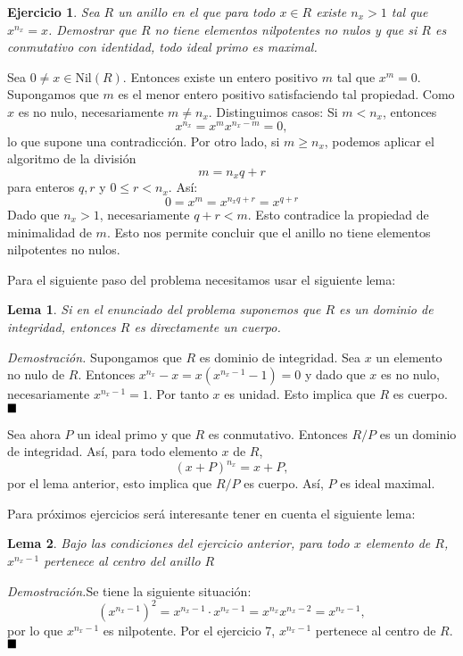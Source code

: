 \documentclass[11pt]{book}
\def\Nil{\mathrm{Nil}}
\def\qed{\hfill\blacksquare}
\newtheorem{ej}{Ejercicio}
\newtheorem{lemma}{Lema}
\theoremstyle{definition}
\begin{document}
\begin{ej}
    Sea $R$ un anillo en el que para todo $x\in R$ existe $n_x>1$ tal que $x^{n_x}=x$. Demostrar que $R$ no tiene elementos nilpotentes no nulos y que si $R$ es conmutativo con identidad, todo ideal primo es maximal.
\end{ej}
Sea $0\neq x\in \Nil(R)$. Entonces existe un entero positivo $m$ tal que $x^m=0$. Supongamos que $m$ es el menor entero positivo satisfaciendo tal propiedad. Como $x$ es no nulo, necesariamente $m\neq n_x$. Distinguimos casos: Si $m<n_x$, entonces \[
x^{n_x}=x^mx^{n_x-m}=0,
\]lo que supone una contradicción. Por otro lado, si $m\geq n_x$, podemos aplicar el algoritmo de la división\[
m=n_xq+r
\]para enteros $q,r$ y $0\leq r<n_x$. Así:\[
0=x^m=x^{n_xq+r}=x^{q+r}
\]Dado que $n_x>1$, necesariamente $q+r<m$. Esto contradice la propiedad de minimalidad de $m$. Esto nos permite concluir que el anillo no tiene elementos nilpotentes no nulos.

Para el siguiente paso del problema necesitamos usar el siguiente lema:
\begin{lemma}\label{lema-1}
    Si en el enunciado del problema suponemos que $R$ es un dominio de integridad, entonces $R$ es directamente un cuerpo.
\end{lemma}
\noindent\textit{Demostración.} Supongamos que $R$ es dominio de integridad. Sea $x$ un elemento no nulo de $R$. Entonces $x^{n_x}-x=x(x^{n_x-1}-1)=0$ y dado que $x$ es no nulo, necesariamente $x^{n_x-1}=1$. Por tanto $x$ es unidad. Esto implica que $R$ es cuerpo.$\qed$

Sea ahora $P$ un ideal primo y que $R$ es conmutativo. Entonces $R/P$ es un dominio de integridad. Así, para todo elemento $x$ de $R$,\[
(x+P)^{n_x}=x+P,
\]por el lema anterior, esto implica que $R/P$ es cuerpo. Así, $P$ es ideal maximal.

Para próximos ejercicios será interesante tener en cuenta el siguiente lema:\begin{lemma}\label{lema-2}
    Bajo las condiciones del ejercicio anterior, para todo $x$ elemento de $R$, $x^{n_x-1}$ pertenece al centro del anillo $R$
\end{lemma}
\noindent\textit{Demostración.}Se tiene la siguiente situación:\[
(x^{n_x-1})^2=x^{n_x-1}\cdot x^{n_x-1}=x^{n_x}x^{n_x-2}=x^{n_x-1},
\]por lo que $x^{n_x-1}$ es nilpotente. Por el ejercicio 7, $x^{n_x-1}$ pertenece al centro de $R$.$\qed$
\end{document}
